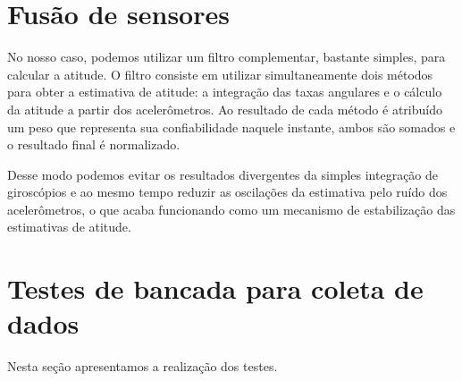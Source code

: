 \section{Fusão de sensores}

No nosso caso, podemos utilizar um filtro complementar, bastante simples, para calcular a atitude. O filtro consiste em utilizar simultaneamente dois métodos para obter a estimativa de atitude: a integração das taxas angulares e o cálculo da atitude a partir dos acelerômetros. Ao resultado de cada método é atribuído um peso que representa sua confiabilidade naquele instante, ambos são somados e o resultado final é normalizado. 

Desse modo podemos evitar os resultados divergentes da simples integração de giroscópios e ao mesmo tempo reduzir as oscilações da estimativa pelo ruído dos acelerômetros, o que acaba funcionando como um mecanismo de estabilização das estimativas de atitude.

\section{Testes de bancada para coleta de dados}

Nesta seção apresentamos a realização dos testes.



